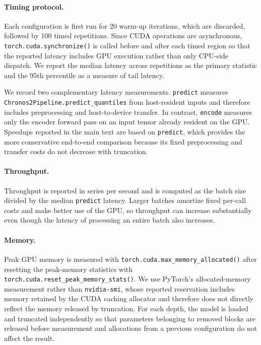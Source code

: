 \documentclass{article}
\begin{document}
\paragraph{Timing protocol.}
Each configuration is first run for 20 warm-up iterations, which are discarded, followed by 100 timed repetitions. Since CUDA operations are asynchronous, \texttt{torch.cuda.synchronize()} is called before and after each timed region so that the reported latency includes GPU execution rather than only CPU-side dispatch. We report the median latency across repetitions as the primary statistic and the 95th percentile as a measure of tail latency.

We record two complementary latency measurements. \texttt{predict} measures \texttt{Chronos2Pipeline.predict\_quantiles} from host-resident inputs and therefore includes preprocessing and host-to-device transfer. In contrast, \texttt{encode} measures only the encoder forward pass on an input tensor already resident on the GPU. Speedups reported in the main text are based on \texttt{predict}, which provides the more conservative end-to-end comparison because its fixed preprocessing and transfer costs do not decrease with truncation.

\paragraph{Throughput.}
Throughput is reported in series per second and is computed as the batch size divided by the median \texttt{predict} latency. Larger batches amortize fixed per-call costs and make better use of the GPU, so throughput can increase substantially even though the latency of processing an entire batch also increases.

\paragraph{Memory.}
Peak GPU memory is measured with \texttt{torch.cuda.max\_memory\_allocated()} after resetting the peak-memory statistics with \texttt{torch.cuda.reset\_peak\_memory\_stats()}. We use PyTorch's allocated-memory measurement rather than \texttt{nvidia-smi}, whose reported reservation includes memory retained by the CUDA caching allocator and therefore does not directly reflect the memory released by truncation. For each depth, the model is loaded and truncated independently so that parameters belonging to removed blocks are released before measurement and allocations from a previous configuration do not affect the result.
\end{document}
